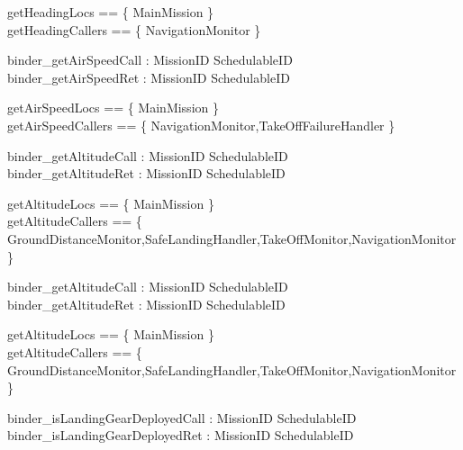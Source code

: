 %
\begin{zed}
getHeadingLocs == \{ MainMission \}  \\
getHeadingCallers == \{ NavigationMonitor \}
\end{zed}
%
\begin{circus}

\circchannel binder\_getAirSpeedCall :  MissionID  \cross SchedulableID  \\
\circchannel binder\_getAirSpeedRet : MissionID \cross SchedulableID \cross {} \\
\end{circus}
%
\begin{zed}
getAirSpeedLocs == \{ MainMission \}  \\
getAirSpeedCallers == \{ NavigationMonitor,TakeOffFailureHandler \}
\end{zed}
%
\begin{circus}

\circchannel binder\_getAltitudeCall :  MissionID  \cross SchedulableID  \\
\circchannel binder\_getAltitudeRet : MissionID \cross SchedulableID \cross {} \\
\end{circus}
%
\begin{zed}
getAltitudeLocs == \{ MainMission \}  \\
getAltitudeCallers == \{ GroundDistanceMonitor,SafeLandingHandler,TakeOffMonitor,NavigationMonitor \}
\end{zed}
%
\begin{circus}

\circchannel binder\_getAltitudeCall :  MissionID  \cross SchedulableID  \\
\circchannel binder\_getAltitudeRet : MissionID \cross SchedulableID \cross {} \\
\end{circus}
%
\begin{zed}
getAltitudeLocs == \{ MainMission \}  \\
getAltitudeCallers == \{ GroundDistanceMonitor,SafeLandingHandler,TakeOffMonitor,NavigationMonitor \}
\end{zed}
%
\begin{circus}

\circchannel binder\_isLandingGearDeployedCall :  MissionID  \cross SchedulableID  \\
\circchannel binder\_isLandingGearDeployedRet : MissionID \cross SchedulableID \cross \boolean \\
\end{circus}

